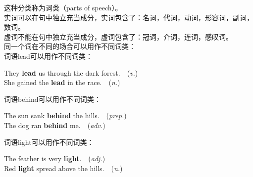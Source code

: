 \documentclass[UTF8]{ctexart}
\begin{document}
    这种分类称为词类（{\ttfamily parts of speech}）。\\[3mm]
    实词可以在句中独立充当成分，实词包含了：名词，代词，动词，形容词，副词，数词。\\[3mm]
    虚词不能在句中独立充当成分，虚词包含了：冠词，介词，连词，感叹词。\\[8mm]
    同一个词在不同的场合可以用作不同词类：\\[4mm]
    词语{\ttfamily lead}可以用作不同词类：
    \begin{center}
        \ttfamily
        They \textbf{lead} us through the dark forest.~~(\textit{v.})\\[3mm]
        She gained the \textbf{lead} in the race.~~(\textit{n.})\\[6mm]
    \end{center}
    词语{\ttfamily behind}可以用作不同词类：
    \begin{center}
        \ttfamily
        The sun sank \textbf{behind} the hills.~~(\textit{prep.})\\[3mm]
        The dog ran \textbf{behind} me.~~(\textit{adv.})\\[6mm]
    \end{center}
    词语{\ttfamily light}可以用作不同词类：
    \begin{center}
        \ttfamily
        The feather is very \textbf{light}.~~(\textit{adj.})\\[3mm]
        Red \textbf{light} spread above the hills.~~(\textit{n.})
    \end{center}

\newpage
\end{document}
